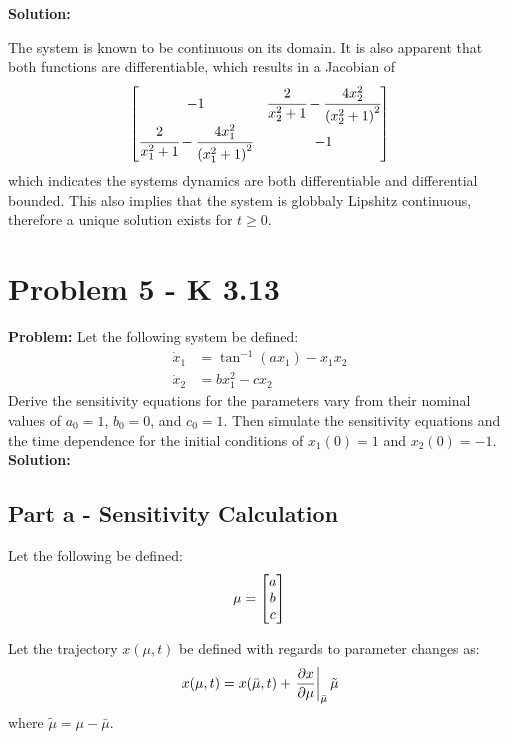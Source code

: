 \documentclass[letter]{article}
\begin{document}
\noindent
\textbf{Solution:}

The system is known to be continuous on its domain. It is also apparent that both functions are differentiable, which results in a Jacobian of
\begin{equation}
	\mqty[-1		& \cfrac{2}{x_2^2 + 1} - \cfrac{4 x_2^2}{\qty(x_2^2 + 1)^2}\\
		  \cfrac{2}{x_1^2 + 1} - \cfrac{4 x_1^2}{\qty(x_1^2 + 1)^2} & -1]
\end{equation}
which indicates the systems dynamics are both differentiable and differential bounded. This also implies that the system is globbaly Lipshitz continuous, therefore a unique solution exists for $t\geq 0$.

\newpage
\section{Problem 5 - K 3.13}
\textbf{Problem:}
Let the following system be defined:
\begin{equation}
	\begin{aligned}
		\dot{x}_1 &= \tan^{-1}(ax_1) - x_1 x_2\\
		\dot{x}_2 &= b x_1^2 - c x_2
	\end{aligned}
\end{equation}
Derive the sensitivity equations for the parameters vary from their nominal values of $a_0 = 1$, $b_0 = 0$, and $c_0 = 1$. Then simulate the sensitivity equations and the time dependence for the initial conditions of $x_1(0) = 1$ and $x_2(0) = -1$.\\

\noindent
\textbf{Solution:}
\subsection{Part a - Sensitivity Calculation}
Let the following be defined: $$\mu = \mqty[a \\ b \\ c]$$

Let the trajectory $x(\mu, t)$ be defined with regards to parameter changes as:
\begin{equation}
	x(\mu,t) = x(\bar{\mu},t) + \eval{\pdv{x}{\mu}}_{\bar{\mu}} \tilde{\mu}
\end{equation}
where $\tilde{\mu} = \mu - \bar{\mu}$.
\end{document}
